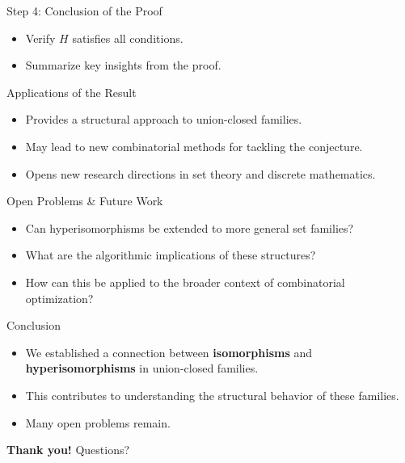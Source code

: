 \documentclass{beamer}
\begin{document}
\begin{frame}{Step 4: Conclusion of the Proof}
	\begin{itemize}
		\item Verify $H$ satisfies all conditions.
		\item Summarize key insights from the proof.
	\end{itemize}
\end{frame}

\begin{frame}{Applications of the Result}
	\begin{itemize}
		\item Provides a structural approach to union-closed families.
		\item May lead to new combinatorial methods for tackling the conjecture.
		\item Opens new research directions in set theory and discrete mathematics.
	\end{itemize}
\end{frame}

\begin{frame}{Open Problems & Future Work}
	\begin{itemize}
		\item Can hyperisomorphisms be extended to more general set families?
		\item What are the algorithmic implications of these structures?
		\item How can this be applied to the broader context of combinatorial optimization?
	\end{itemize}
\end{frame}

\begin{frame}{Conclusion}
	\begin{itemize}
		\item We established a connection between \textbf{isomorphisms} and \textbf{hyperisomorphisms} in union-closed families.
		\item This contributes to understanding the structural behavior of these families.
		\item Many open problems remain.
	\end{itemize}
	\bigskip
	\centering \textbf{Thank you!} \quad Questions?
\end{frame}
\end{document}
